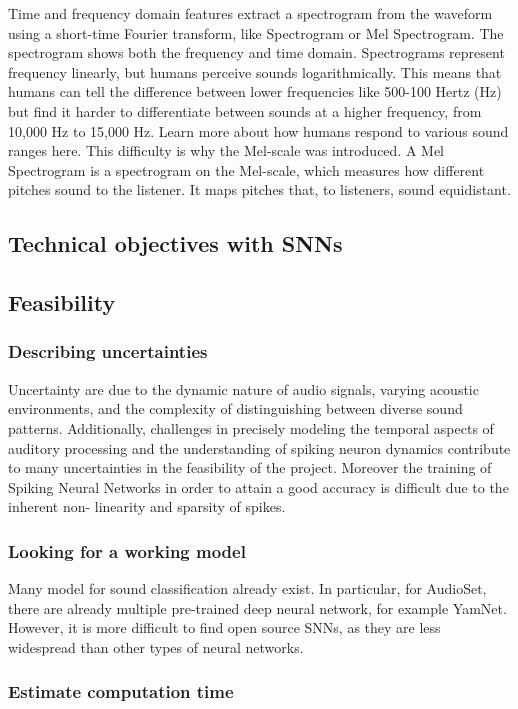 \documentclass[11pt]{article}
\begin{document}
{  Time and frequency domain features extract a spectrogram from the waveform using a short-time Fourier transform, like Spectrogram or Mel Spectrogram. The spectrogram shows both the frequency and time domain. Spectrograms represent frequency linearly, but humans perceive sounds logarithmically. This means that humans can tell the difference between lower frequencies like 500-100 Hertz (Hz) but find it harder to differentiate between sounds at a higher frequency, from 10,000 Hz to 15,000 Hz. Learn more about how humans respond to various sound ranges here. This difficulty is why the Mel-scale was introduced. A Mel Spectrogram is a spectrogram on the Mel-scale, which measures how different pitches sound to the listener. It maps pitches that, to listeners, sound equidistant.

}


\subsection{Technical objectives with SNNs}
\subsection{Feasibility}
\subsubsection{Describing uncertainties}
Uncertainty are due to the dynamic nature of audio signals, varying acoustic environments, and the complexity of distinguishing between diverse sound patterns. Additionally, challenges in precisely modeling the temporal aspects of auditory processing and the understanding of spiking neuron dynamics contribute to many uncertainties in the feasibility of the project. Moreover the training of Spiking Neural Networks in order to attain a good accuracy is difficult due to the inherent non- linearity and sparsity of spikes.


\subsubsection{Looking for a working model}

Many model for sound classification already exist. In particular, for AudioSet, there are already multiple pre-trained deep neural network, for example YamNet. However, it is more difficult to find open source SNNs, as they are less widespread than other types of neural networks.


\subsubsection{Estimate computation time}
\end{document}
